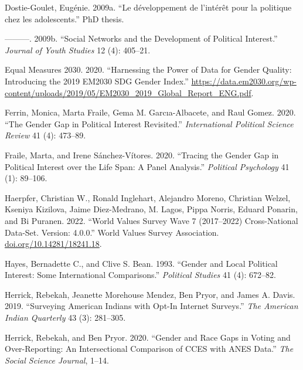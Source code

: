 \documentclass[
  letterpaper,
  DIV=11,
  numbers=noendperiod]{scrreprt}
\newlength{\cslhangindent}
\newlength{\cslentryspacingunit} %
\newenvironment{CSLReferences}[2] %
 {%
  \setlength{\parindent}{0pt}
  \ifodd #1
  \let\oldpar\par
  \def\par{\hangindent=\cslhangindent\oldpar}
  \fi
  \setlength{\parskip}{#2\cslentryspacingunit}
 }%
 {}
\begin{document}
\begin{CSLReferences}{1}{0}
\leavevmode{}%
Dostie-Goulet, Eugénie. 2009a. {``{Le d{é}veloppement de l'int{é}r{ê}t
pour la politique chez les adolescents}.''} PhD thesis.

\leavevmode{}%
---------. 2009b. {``{Social Networks and the Development of Political
Interest}.''} \emph{Journal of Youth Studies} 12 (4): 405--21.

\leavevmode{}%
Equal Measures 2030. 2020. {``{Harnessing the Power of Data for Gender
Quality: Introducing the 2019 EM2030 SDG Gender Index}.''}
\url{https://data.em2030.org/wp-content/uploads/2019/05/EM2030_2019_Global_Report_ENG.pdf}.

\leavevmode{}%
Ferrin, Monica, Marta Fraile, Gema M. Garcıa-Albacete, and Raul Gomez.
2020. {``{The Gender Gap in Political Interest Revisited}.''}
\emph{International Political Science Review} 41 (4): 473--89.

\leavevmode{}%
Fraile, Marta, and Irene Sánchez-Vítores. 2020. {``{Tracing the Gender
Gap in Political Interest over the Life Span: A Panel Analysis}.''}
\emph{Political Psychology} 41 (1): 89--106.

\leavevmode{}%
Haerpfer, Christian W., Ronald Inglehart, Alejandro Moreno, Christian
Welzel, Kseniya Kizilova, Jaime Diez-Medrano, M. Lagos, Pippa Norris,
Eduard Ponarin, and Bi Puranen. 2022. {``{World Values Survey Wave 7
(2017--2022) Cross-National Data-Set. Version: 4.0.0}.''} World Values
Survey Association.
\href{https://doi.org/10.14281/18241.18}{doi.org/10.14281/18241.18}.

\leavevmode{}%
Hayes, Bernadette C., and Clive S. Bean. 1993. {``{Gender and Local
Political Interest: Some International Comparisons}.''} \emph{Political
Studies} 41 (4): 672--82.

\leavevmode{}%
Herrick, Rebekah, Jeanette Morehouse Mendez, Ben Pryor, and James A.
Davis. 2019. {``{Surveying American Indians with Opt-In Internet
Surveys}.''} \emph{The American Indian Quarterly} 43 (3): 281--305.

\leavevmode{}%
Herrick, Rebekah, and Ben Pryor. 2020. {``{Gender and Race Gaps in
Voting and Over-Reporting: An Intersectional Comparison of CCES with
ANES Data}.''} \emph{The Social Science Journal}, 1--14.


\end{CSLReferences}
\end{document}
